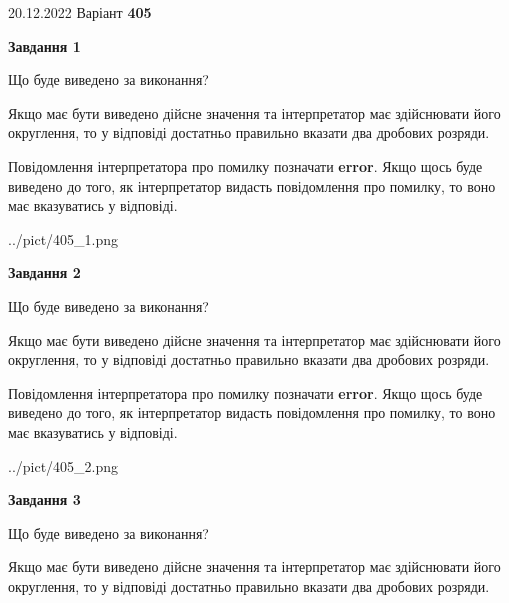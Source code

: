 \documentclass[12pt, ukrainian]{article}
\begin{document}
{20.12.2022 Варіант \No \textbf { 405 }\par}
{
\begin {Large}

{\begin {center}\textbf{Завдання 1}\end {center}}\par
Що буде виведено за виконання? \par

Якщо має бути виведено дійсне значення та інтерпретатор має здійснювати його округлення, 
то у відповіді достатньо правильно вказати два дробових розряди.

Повідомлення інтерпретатора про помилку позначати \textbf{error}.
Якщо щось буде виведено до того, як інтерпретатор видасть повідомлення про помилку, 
то воно має вказуватись у відповіді. \par

\begin{center}
	{../pict/405_1.png}
\end{center}
\newpage

{\begin {center}\textbf{Завдання 2}\end {center}}\par
Що буде виведено за виконання? \par

Якщо має бути виведено дійсне значення та інтерпретатор має здійснювати його округлення, 
то у відповіді достатньо правильно вказати два дробових розряди.

Повідомлення інтерпретатора про помилку позначати \textbf{error}.
Якщо щось буде виведено до того, як інтерпретатор видасть повідомлення про помилку, 
то воно має вказуватись у відповіді. \par

\begin{center}
	{../pict/405_2.png}
\end{center}
\newpage

{\begin {center}\textbf{Завдання 3}\end {center}}\par
Що буде виведено за виконання? \par

Якщо має бути виведено дійсне значення та інтерпретатор має здійснювати його округлення, 
то у відповіді достатньо правильно вказати два дробових розряди.


\end{Large}}
\end{document}
